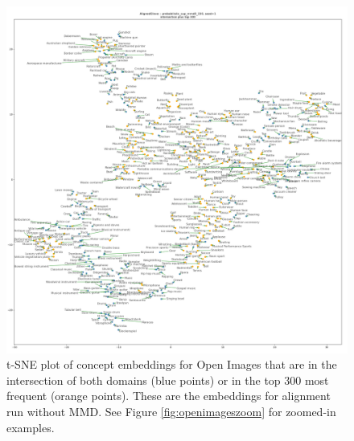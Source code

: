 \begin{figure}[H]
    \centering
    \includegraphics[width=\textwidth]{images/results/intersection_top300_tsne_openimages_probabilistic_sup_mmd0_150_AlignedGlove_1.png}
    \caption{
        t-SNE plot of concept embeddings for Open Images that are in the intersection of both domains (blue points) or in the top 300 most frequent (orange points). These are the embeddings for alignment run without MMD. See Figure \ref{fig:openimageszoom} for zoomed-in examples. 
    }
\end{figure}

